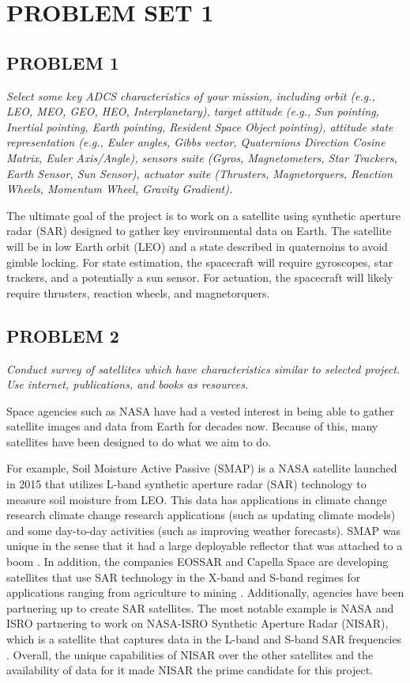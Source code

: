 \section{\Large PROBLEM SET 1}
\subsection{PROBLEM 1}
\textit{Select some key ADCS characteristics of your mission, including orbit (e.g., LEO, MEO, GEO, HEO, Interplanetary), target attitude (e.g., Sun pointing, Inertial pointing, Earth pointing, Resident Space Object pointing), attitude state representation (e.g., Euler angles, Gibbs vector, Quaternions Direction Cosine Matrix, Euler Axis/Angle), sensors suite (Gyros, Magnetometers, Star Trackers, Earth Sensor, Sun Sensor), actuator suite (Thrusters, Magnetorquers, Reaction Wheels, Momentum Wheel, Gravity Gradient).}

The ultimate goal of the project is to work on a satellite using synthetic aperture radar (SAR) designed to gather key environmental data on Earth. The satellite will be in low Earth orbit (LEO) and a state described in quaternoins to avoid gimble locking. For state estimation, the spacecraft will require gyroscopes, star trackers, and a potentially a sun sensor. For actuation, the spacecraft will likely require thrusters, reaction wheels, and magnetorquers.

\subsection{PROBLEM 2}
\textit{Conduct survey of satellites which have characteristics similar to selected project. Use internet, publications, and books as resources.}

Space agencies such as NASA have had a vested interest in being able to gather satellite images and data from Earth for decades now. Because of this, many satellites have been designed to do what we aim to do.

For example, Soil Moisture Active Passive (SMAP) is a NASA satellite launched in 2015 that utilizes L-band synthetic aperture radar (SAR) technology to measure soil moisture from LEO. This data has applications in climate change research climate change research applications (such as updating climate models) and some day-to-day activities (such as improving weather forecasts). SMAP was unique in the sense that it had a large deployable reflector that was attached to a boom \cite{SMAP}. In addition, the companies EOSSAR and Capella Space are developing satellites that use SAR technology in the X-band and S-band regimes for applications ranging from agriculture to mining \cite{EOSSAR, Capella}. Additionally, agencies have been partnering up to create SAR satellites. The most notable example is NASA and ISRO partnering to work on NASA-ISRO Synthetic Aperture Radar (NISAR), which is a satellite that captures data in the L-band and S-band SAR frequencies \cite{NisarMission}. Overall, the unique capabilities of NISAR over the other satellites and the availability of data for it made NISAR the prime candidate for this project.

